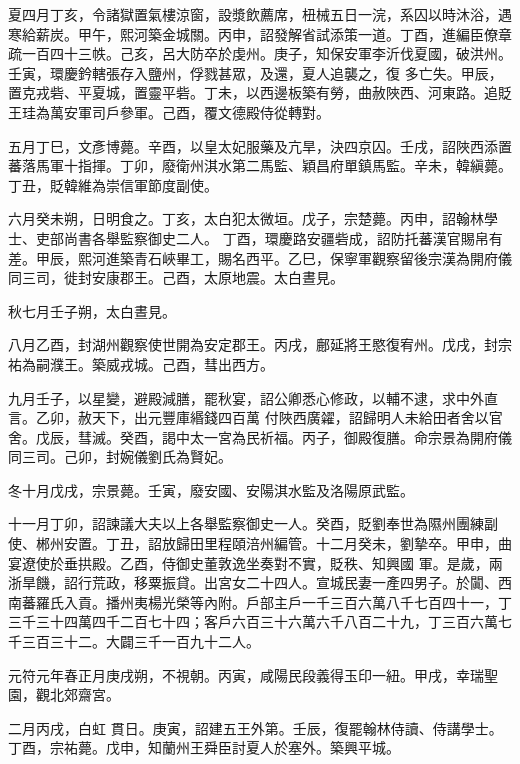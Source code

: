 \begin{pinyinscope}
 夏四月丁亥，令諸獄置氣樓涼窗，設漿飲薦席，杻械五日一浣，系囚以時沐浴，遇寒給薪炭。甲午，熙河築金城關。丙申，詔發解省試添策一道。丁酉，進編臣僚章疏一百四十三帙。己亥，呂大防卒於虔州。庚子，知保安軍李沂伐夏國，破洪州。壬寅，環慶鈐轄張存入鹽州，俘戮甚眾，及還，夏人追襲之，復
 多亡失。甲辰，置克戎砦、平夏城，置靈平砦。丁未，以西邊板築有勞，曲赦陜西、河東路。追貶王珪為萬安軍司戶參軍。己酉，覆文德殿侍從轉對。



 五月丁巳，文彥博薨。辛酉，以皇太妃服藥及亢旱，決四京囚。壬戌，詔陜西添置蕃落馬軍十指揮。丁卯，廢衛州淇水第二馬監、穎昌府單鎮馬監。辛未，韓縝薨。丁丑，貶韓維為崇信軍節度副使。



 六月癸未朔，日明食之。丁亥，太白犯太微垣。戊子，宗楚薨。丙申，詔翰林學士、吏部尚書各舉監察御史二人。
 丁酉，環慶路安疆砦成，詔防托蕃漢官賜帛有差。甲辰，熙河進築青石峽畢工，賜名西平。乙巳，保寧軍觀察留後宗漢為開府儀同三司，徙封安康郡王。己酉，太原地震。太白晝見。



 秋七月壬子朔，太白晝見。



 八月乙酉，封湖州觀察使世開為安定郡王。丙戌，鄜延將王愍復宥州。戊戌，封宗祐為嗣濮王。築威戎城。己酉，彗出西方。



 九月壬子，以星變，避殿減膳，罷秋宴，詔公卿悉心修政，以輔不逮，求中外直言。乙卯，赦天下，出元豐庫緡錢四百萬
 付陜西廣糴，詔歸明人未給田者舍以官舍。戊辰，彗滅。癸酉，謁中太一宮為民祈福。丙子，御殿復膳。命宗景為開府儀同三司。己卯，封婉儀劉氏為賢妃。



 冬十月戊戌，宗景薨。壬寅，廢安國、安陽淇水監及洛陽原武監。



 十一月丁卯，詔諫議大夫以上各舉監察御史一人。癸酉，貶劉奉世為隰州團練副使、郴州安置。丁丑，詔放歸田里程頤涪州編管。十二月癸未，劉摯卒。甲申，曲宴遼使於垂拱殿。乙酉，侍御史董敦逸坐奏對不實，貶秩、知興國
 軍。是歲，兩浙旱饑，詔行荒政，移粟振貸。出宮女二十四人。宣城民妻一產四男子。於闐、西南蕃羅氏入貢。播州夷楊光榮等內附。戶部主戶一千三百六萬八千七百四十一，丁三千三十四萬四千二百七十四；客戶六百三十六萬六千八百二十九，丁三百六萬七千三百三十二。大闢三千一百九十二人。



 元符元年春正月庚戌朔，不視朝。丙寅，咸陽民段義得玉印一紐。甲戌，幸瑞聖園，觀北郊齋宮。



 二月丙戌，白虹
 貫日。庚寅，詔建五王外第。壬辰，復罷翰林侍讀、侍講學士。丁酉，宗祐薨。戊申，知蘭州王舜臣討夏人於塞外。築興平城。




\end{pinyinscope}
